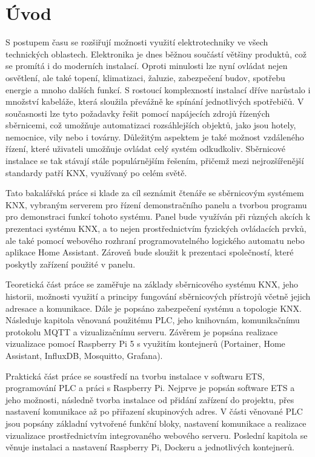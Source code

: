 \chapter*{Úvod}
{}

S postupem času se rozšiřují možnosti využití elektrotechniky ve všech technických oblastech. Elektronika je dnes běžnou součástí většiny produktů, což se promítá i do moderních instalací. Oproti minulosti lze nyní ovládat nejen osvětlení, ale také topení, klimatizaci, žaluzie, zabezpečení budov, spotřebu energie a mnoho dalších funkcí. S rostoucí komplexností instalací dříve narůstalo i množství kabeláže, která sloužila převážně ke spínání jednotlivých spotřebičů. V současnosti lze tyto požadavky řešit pomocí napájecích zdrojů řízených sběrnicemi, což umožňuje automatizaci rozsáhlejších objektů, jako jsou hotely, nemocnice, vily nebo i továrny. Důležitým aspektem je také možnost vzdáleného řízení, které uživateli umožňuje ovládat celý systém odkudkoliv. Sběrnicové instalace se tak stávají stále populárnějším řešením, přičemž mezi nejrozšířenější standardy patří KNX, využívaný po celém světě.

Tato bakalářská práce si klade za cíl seznámit čtenáře se sběrnicovým systémem KNX, vybraným serverem pro řízení demonstračního panelu a tvorbou programu pro demonstraci funkcí tohoto systému. Panel bude využíván při různých akcích k prezentaci systému KNX, a to nejen prostřednictvím fyzických ovládacích prvků, ale také pomocí webového rozhraní programovatelného logického automatu nebo aplikace Home Assistant. Zároveň bude sloužit k prezentaci společností, které poskytly zařízení použité v panelu.

Teoretická část práce se zaměřuje na základy sběrnicového systému KNX, jeho historii, možnosti využití a principy fungování sběrnicových přístrojů včetně jejich adresace a komunikace. Dále je popsáno zabezpečení systému a topologie KNX. Následuje kapitola věnovaná použitému PLC, jeho knihovnám, komunikačnímu protokolu MQTT a vizualizačnímu serveru. Závěrem je popsána realizace vizualizace pomocí Raspberry Pi 5 s využitím kontejnerů (Portainer, Home Assistant, InfluxDB, Mosquitto, Grafana).

Praktická část práce se soustředí na tvorbu instalace v softwaru ETS, programování PLC a práci s Raspberry Pi. Nejprve je popsán software ETS a jeho možnosti, následně tvorba instalace od přidání zařízení do projektu, přes nastavení komunikace až po přiřazení skupinových adres. V části věnované PLC jsou popsány základní vytvořené funkční bloky, nastavení komunikace a realizace vizualizace prostřednictvím integrovaného webového serveru. Poslední kapitola se věnuje instalaci a nastavení Raspberry Pi, Dockeru a jednotlivých kontejnerů.